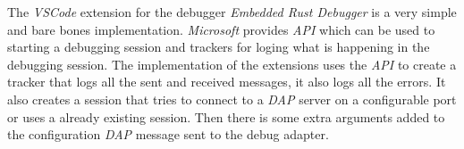 The \emph{VSCode} extension for the debugger \emph{Embedded Rust Debugger} is a very simple and bare bones implementation.
\emph{Microsoft} provides \emph{API} which can be used to starting a debugging session and trackers for loging what is happening in the debugging session.
The implementation of the extensions uses the \emph{API} to create a tracker that logs all the sent and received messages, it also logs all the errors.
It also creates a session that tries to connect to a \emph{DAP} server on a configurable port or uses a already existing session.
Then there is some extra arguments added to the configuration \emph{DAP} message sent to the debug adapter.

